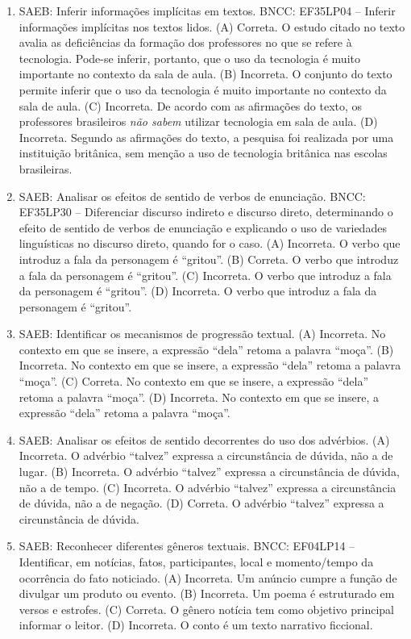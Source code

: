 \begin{enumerate}
\item
SAEB: Inferir informações implícitas em textos. BNCC: EF35LP04 -- Inferir informações implícitas nos textos lidos. 
(A) Correta. O estudo citado no texto avalia as deficiências da formação dos professores no que se refere à tecnologia. Pode-se inferir, portanto, que o uso da tecnologia é muito importante no contexto da sala de aula. 
(B) Incorreta. O conjunto do texto permite inferir que o uso da tecnologia é muito importante no contexto da sala de aula. 
(C) Incorreta. De acordo com as afirmações do texto, os professores brasileiros \textit{não sabem} utilizar tecnologia em sala de aula. 
(D) Incorreta. Segundo as afirmações do texto, a pesquisa foi realizada por uma instituição britânica, sem menção a uso de tecnologia britânica nas escolas brasileiras.

\item
SAEB: Analisar os efeitos de sentido de verbos de enunciação. BNCC: EF35LP30 -- Diferenciar discurso indireto e discurso direto, determinando o efeito de sentido de verbos de enunciação e explicando o uso de variedades linguísticas no discurso direto, quando for o caso. 
(A) Incorreta. O verbo que introduz a fala da personagem é ``gritou''. 
(B) Correta. O verbo que introduz a fala da personagem é ``gritou''. 
(C) Incorreta. O verbo que introduz a fala da personagem é ``gritou''. 
(D) Incorreta. O verbo que introduz a fala da personagem é ``gritou''.

\item
SAEB: Identificar os mecanismos de progressão textual. 
(A) Incorreta. No contexto em que se insere, a expressão ``dela'' retoma a palavra ``moça''. 
(B) Incorreta. No contexto em que se insere, a expressão ``dela'' retoma a palavra ``moça''. 
(C) Correta. No contexto em que se insere, a expressão ``dela'' retoma a palavra ``moça''. 
(D) Incorreta. No contexto em que se insere, a expressão ``dela'' retoma a palavra ``moça''.

\item
SAEB: Analisar os efeitos de sentido decorrentes do uso dos advérbios. 
(A) Incorreta. O advérbio ``talvez'' expressa a circunstância de dúvida, não a de lugar. 
(B) Incorreta. O advérbio ``talvez'' expressa a circunstância de dúvida, não a de tempo. 
(C) Incorreta. O advérbio ``talvez'' expressa a circunstância de dúvida, não a de negação. 
(D) Correta. O advérbio ``talvez'' expressa a circunstância de dúvida.

\item
SAEB: Reconhecer diferentes gêneros textuais. BNCC: EF04LP14 -- Identificar, em notícias, fatos, participantes, local e momento/tempo da ocorrência do fato noticiado. 
(A) Incorreta. Um anúncio cumpre a função de divulgar um produto ou evento. 
(B) Incorreta. Um poema é estruturado em versos e estrofes. 
(C) Correta. O gênero notícia tem como objetivo principal informar o leitor. 
(D) Incorreta. O conto é um texto narrativo ficcional.


\end{enumerate}

